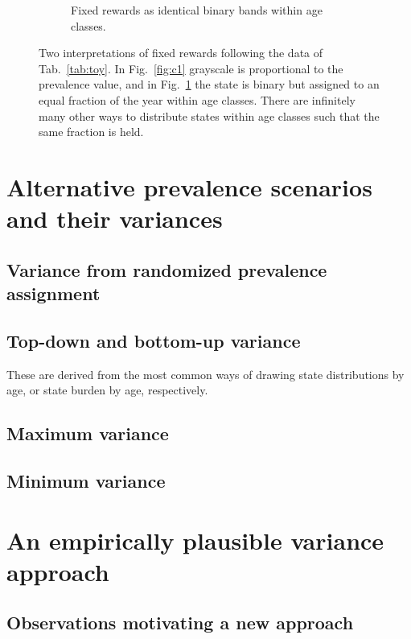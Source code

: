 \documentclass{bmcart}
\begin{document}
\begin{figure}
\begin{subfigure}[b]{0.4\textwidth}
        \caption{Fixed rewards as identical binary bands within age classes.}
        \label{fig:c2}
    \end{subfigure}
    \caption{Two interpretations of fixed rewards following the data of Tab.~\ref{tab:toy}. In Fig.~\ref{fig:c1} grayscale is proportional to the prevalence value, and in Fig.~\ref{fig:c2} the state is binary but assigned to an equal fraction of the year within age classes. There are infinitely many other ways to distribute states within age classes such that the same fraction is held.}
    \label{fig:fixedexplain}
\end{figure}
\FloatBarrier

\section{Alternative prevalence scenarios and their variances}

\subsection{Variance from randomized prevalence assignment}

\subsection{Top-down and bottom-up variance}

These are derived from the most common ways of drawing state distributions by age, or state burden by age, respectively.

\subsection{Maximum variance}

\subsection{Minimum variance}

\section{An empirically plausible variance approach}

\subsection{Observations motivating a new approach}
\end{document}
